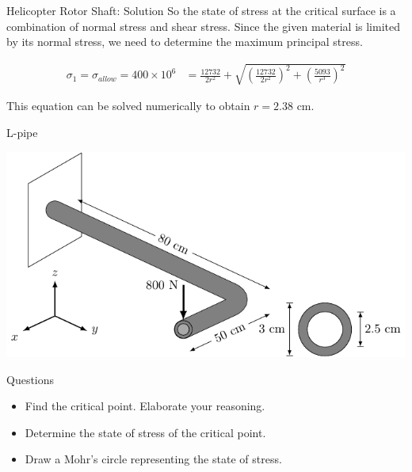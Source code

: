 \documentclass[10pt, svgnames]{beamer}
\begin{document}
\begin{frame}[label={sec:org9891dfe}]{Helicopter Rotor Shaft: Solution}
So the state of stress at the critical surface is a combination of normal stress and shear stress. Since the given material is limited by its normal stress, we need to determine the maximum principal stress.

\begin{align*}
\sigma_1 = \sigma_{allow} = 400 \times 10^6 &= \frac{12732}{2r^2} + \sqrt{ \left( \frac{12732}{2r^2} \right)^2 + \left( \frac{5093}{r^3} \right)^2 }
\end{align*}

This equation can be solved numerically to obtain \(r = 2.38\) cm.
\end{frame}

\begin{frame}[label={sec:org9f27425}]{L-pipe}
\begin{center}
\includegraphics[width=.9\linewidth]{pictures/l-pipe.pdf}
\end{center}
\end{frame}

\begin{frame}[label={sec:org039321e}]{Questions}
\begin{itemize}
\item Find the critical point. Elaborate your reasoning.
\item Determine the state of stress of the critical point.
\item Draw a Mohr's circle representing the state of stress.
\end{itemize}
\end{frame}
\end{document}
